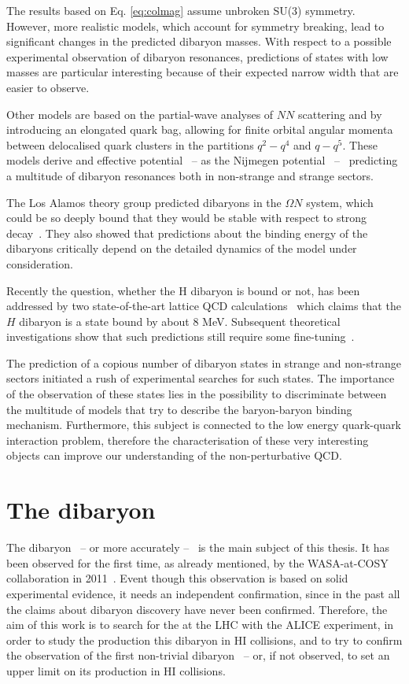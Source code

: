 The results based on Eq. \eqref{eq:colmag} assume unbroken SU(3) symmetry.
However, more realistic models, which account for symmetry breaking, lead to significant changes
in the predicted dibaryon masses.
With respect to a possible experimental observation of dibaryon resonances, predictions of states
with low masses are particular interesting because of their expected narrow width that are easier
to observe.

Other models are based on the partial-wave analyses of $NN$ scattering and
by introducing an elongated quark bag, allowing for finite orbital angular momenta between
delocalised quark clusters in the partitions $q^{2}-q^{4}$ and $q-q^{5}$. 
These models derive and effective potential \ -- as the Nijmegen 
potential~\cite{dibpred1,dibpred2,dibpred3} -- \ predicting a multitude of dibaryon resonances
both in non-strange and strange sectors. 

The Los Alamos theory group predicted dibaryons in the $\Omega N$ system, which could be so
deeply bound that they would be stable with respect to strong 
decay~\cite{dsinevitable1,dsinevitable2}.
They also showed that predictions about the binding energy of the dibaryons critically depend
on the detailed dynamics of the model under consideration.

Recently the question, whether the H dibaryon is bound or not, has been addressed by two 
state-of-the-art lattice QCD calculations~\cite{Hlattice1,Hlattice2} which claims that  
the $H$ dibaryon is a state bound by about 8 MeV.
Subsequent theoretical investigations show that such predictions still require some
fine-tuning~\cite{Hlattice3}.

The prediction of a copious number of dibaryon states in strange and non-strange sectors 
initiated a rush of experimental searches for such states. 
The importance of the observation of these states lies in the possibility to discriminate
between the multitude of models that try to describe the baryon-baryon binding mechanism.
Furthermore, this subject is connected to the low energy quark-quark interaction problem,
therefore the characterisation of these very interesting objects can improve our 
understanding of the non-perturbative QCD.

%
%
\section{The \dst dibaryon} \label{sec:2.2}

The \ds dibaryon \ -- or more accurately \dst -- \ is the main subject of this thesis.
It has been observed for the first time, as already mentioned, by the WASA-at-COSY 
collaboration in 2011~\cite{wasa1}.
Event though this observation is based on solid experimental evidence, it needs an independent
confirmation, since in the past all the claims about dibaryon discovery have never been confirmed.
Therefore, the aim of this work is to search for the \dst at the LHC with the ALICE
experiment, in order to study the production this dibaryon in HI collisions, and to
try to confirm the observation of the first non-trivial dibaryon \ -- or, if not observed, to set an
upper limit on its production in HI collisions.

